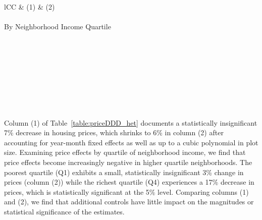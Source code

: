 \documentclass[12pt]{article}
\begin{document}
\begin{table}[htb!]
\small
\centering
\caption{Triple-Difference Estimates of Log-Prices 0 to 500 Meters Outside of Housing Projects}\label{table:priceDDD_het}
\vspace{-2mm}
\begin{tabular}{lCC}
\toprule
 & \small (1) & \small (2)   \\ \midrule 
 \\
By Neighborhood Income Quartile \\[.3em]
 
\bottomrule
{} \\[-.3em]
 \\[-.3em]
 \\[-.3em]
 \\[-.3em]
 \\[-.3em]
 \\[-.3em]
 \\[-.3em]
 \\[-.3em]
\end{tabular}
\end{table}

Column (1) of Table~\ref{table:priceDDD_het} documents a statistically insignificant 7\% decrease in housing prices, which shrinks to 6\% in column (2) after accounting for year-month fixed effects as well as up to a cubic polynomial in plot size.  Examining price effects by quartile of neighborhood income, we find that price effects become increasingly negative in higher quartile neighborhoods.  The poorest quartile (Q1) exhibits a small, statistically insignificant 3\% change in prices (column (2)) while the richest quartile (Q4) experiences a 17\% decrease in prices, which is statistically significant at the 5\% level.  Comparing columns (1) and (2), we find that additional controls have little impact on the magnitudes or statistical significance of the estimates.
\end{document}
